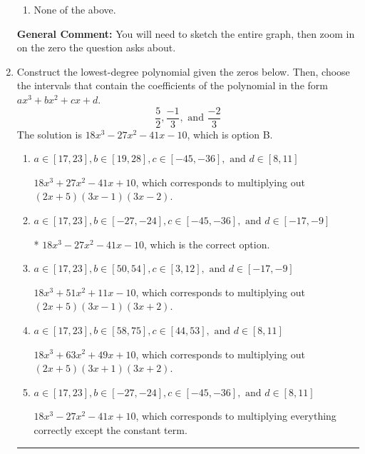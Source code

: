 \documentclass{extbook}[14pt]
\newcommand{\litem}[1]{\item #1

\rule{\textwidth}{0.4pt}}
\begin{document}
\begin{enumerate}
{\begin{enumerate}[label=\Alph*.]
\item None of the above.\end{enumerate}
\textbf{General Comment:} You will need to sketch the entire graph, then zoom in on the zero the question asks about.
}
\litem{
Construct the lowest-degree polynomial given the zeros below. Then, choose the intervals that contain the coefficients of the polynomial in the form $ax^3+bx^2+cx+d$.
\[ \frac{5}{2}, \frac{-1}{3}, \text{ and } \frac{-2}{3} \]The solution is \( 18x^{3} -27 x^{2} -41 x -10 \), which is option B.\begin{enumerate}[label=\Alph*.]
\item \( a \in [17, 23], b \in [19, 28], c \in [-45, -36], \text{ and } d \in [8, 11] \)

$18x^{3} +27 x^{2} -41 x + 10$, which corresponds to multiplying out $(2x + 5)(3x -1)(3x -2)$.
\item \( a \in [17, 23], b \in [-27, -24], c \in [-45, -36], \text{ and } d \in [-17, -9] \)

* $18x^{3} -27 x^{2} -41 x -10$, which is the correct option.
\item \( a \in [17, 23], b \in [50, 54], c \in [3, 12], \text{ and } d \in [-17, -9] \)

$18x^{3} +51 x^{2} +11 x -10$, which corresponds to multiplying out $(2x + 5)(3x -1)(3x + 2)$.
\item \( a \in [17, 23], b \in [58, 75], c \in [44, 53], \text{ and } d \in [8, 11] \)

$18x^{3} +63 x^{2} +49 x + 10$, which corresponds to multiplying out $(2x + 5)(3x + 1)(3x + 2)$.
\item \( a \in [17, 23], b \in [-27, -24], c \in [-45, -36], \text{ and } d \in [8, 11] \)

$18x^{3} -27 x^{2} -41 x + 10$, which corresponds to multiplying everything correctly except the constant term.
\end{enumerate}

}
\end{enumerate}
\end{document}
